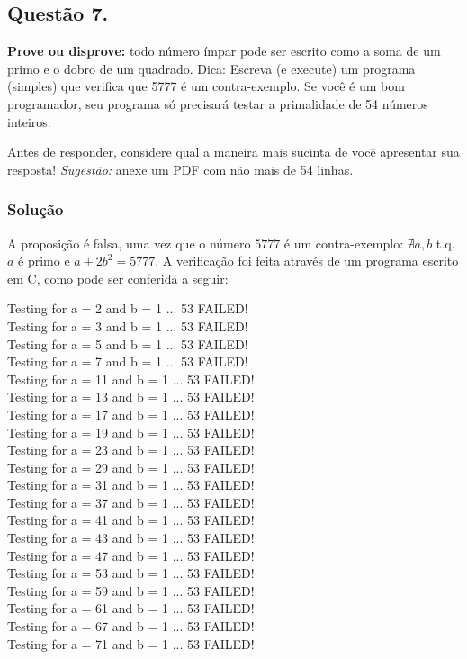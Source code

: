 \documentclass[12pt, letterpaper]{report}
\newcounter{ProblemNum}
\newcommand*{\anyproblem}[1]{\newpage\subsection*{#1}}
\newcommand*{\problem}[1]{\stepcounter{ProblemNum} %
   \anyproblem{Questão #1}}
\newcommand*{\soln}[1]{\subsubsection*{#1}}
\newcommand*{\solution}{\soln{Solução}}
\begin{document}
\problem{7.}
  \textbf{Prove ou disprove:} todo número ímpar pode ser escrito como a soma de um primo e o dobro de um quadrado. Dica: Escreva (e execute) um programa (simples) que verifica que 5777 é um contra-exemplo. Se você é um bom programador, seu programa só precisará testar a primalidade de 54 números inteiros.

  Antes de responder, considere qual a maneira mais sucinta de você apresentar sua resposta! \textit{Sugestão:} anexe um PDF com não mais de 54 linhas.

\solution
  A proposição é falsa, uma vez que o número $5777$ é um contra-exemplo: $\nexists a, b$ t.q. $a$ é primo e $a + 2b^2 = 5777$. A verificação foi feita através de um programa escrito em C, como pode ser conferida a seguir:

  Testing for a = 2 and b = 1 ... 53 FAILED! \\
  Testing for a = 3 and b = 1 ... 53 FAILED! \\
  Testing for a = 5 and b = 1 ... 53 FAILED! \\
  Testing for a = 7 and b = 1 ... 53 FAILED! \\
  Testing for a = 11 and b = 1 ... 53 FAILED! \\
  Testing for a = 13 and b = 1 ... 53 FAILED! \\
  Testing for a = 17 and b = 1 ... 53 FAILED! \\
  Testing for a = 19 and b = 1 ... 53 FAILED! \\
  Testing for a = 23 and b = 1 ... 53 FAILED! \\
  Testing for a = 29 and b = 1 ... 53 FAILED! \\
  Testing for a = 31 and b = 1 ... 53 FAILED! \\
  Testing for a = 37 and b = 1 ... 53 FAILED! \\
  Testing for a = 41 and b = 1 ... 53 FAILED! \\
  Testing for a = 43 and b = 1 ... 53 FAILED! \\
  Testing for a = 47 and b = 1 ... 53 FAILED! \\
  Testing for a = 53 and b = 1 ... 53 FAILED! \\
  Testing for a = 59 and b = 1 ... 53 FAILED! \\
  Testing for a = 61 and b = 1 ... 53 FAILED! \\
  Testing for a = 67 and b = 1 ... 53 FAILED! \\
  Testing for a = 71 and b = 1 ... 53 FAILED! \\
\end{document}
